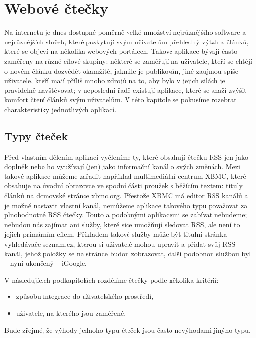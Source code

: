 \chapter{Webové čtečky}


Na internetu je dnes dostupné poměrně velké množství nejrůznějšího software a nejrůznějších služeb, které poskytují svým uživatelům přehledný výtah z článků, které se objeví na několika webových portálech.
Takové aplikace bývají často zaměřeny na různé cílové skupiny: některé se zaměřují na uživatele, kteří se chtějí o novém článku dozvědět okamžitě, jakmile je publikován, jiné zaujmou spíše uživatele, kteří mají příliš mnoho zdrojů na to, aby bylo v jejich silách je pravidelně navštěvovat; v neposlední řadě existují aplikace, které se snaží zvýšit komfort čtení článků svým uživatelům.
V této kapitole se pokusíme rozebrat charakteristiky jednotlivých aplikací.

\section{Typy čteček}

Před vlastním dělením aplikací vyčleníme ty, které obsahují čtečku RSS jen jako doplněk nebo ho využívají (jen) jako informační kanál o svých změnách.
Mezi takové aplikace můžeme zařadit například multimediální centrum XBMC, které obsahuje na úvodní obrazovce ve spodní části proužek s běžícím textem: tituly článků na domovské stránce xbmc.org.
Přestože XBMC má editor RSS kanálů a je možné nastavit vlastní kanál, nemůžeme aplikace takového typu považovat za plnohodnotné RSS čtečky.
Touto a podobnými aplikacemi se zabívat nebudeme; nebudou nás zajímat ani služby, které sice umožňují sledovat RSS, ale není to jejich primárním cílem.
Příkladem takové služby může být titulní stránka vyhledávače seznam.cz, kterou si uživatelé mohou upravit a přidat svůj RSS kanál, jehož položky se na stránce budou zobrazovat, další podobnou službou byl -- nyní ukončený -- iGoogle.

\bigskip

V následujících podkapitolách rozdělíme čtečky podle několika kritérií:
\begin{itemize}
	\item způsobu integrace do uživatelského prostředí,
	\item uživatele, na kterého jsou zaměřené.
\end{itemize}
Bude zřejmé, že výhody jednoho typu čteček jsou často nevýhodami jinýho typu.

